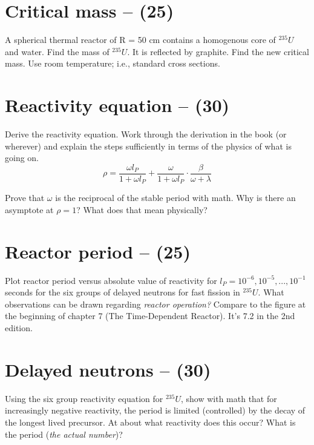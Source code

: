 \documentclass[11pt,a4paper]{article}
\begin{document}
\newpage

\section{Critical mass -- (25)}
A spherical thermal reactor of R = 50 cm contains a homogenous core of $^{235}U$ and water. Find the mass of $^{235}U$. It is reflected by graphite. Find the new critical mass. Use room temperature; i.e., standard cross sections.





\newpage

\section{Reactivity equation -- (30)}
Derive the reactivity equation. Work through the derivation in the book (or wherever) and explain the steps sufficiently in terms of the physics of what is going on.
\begin{equation} \label{eq-reactivity}
    \rho=\frac{\omega l_P}{1+\omega l_P}+\frac{\omega}{1+\omega l_P}\cdot\frac{\beta}{\omega+\lambda}
\end{equation}


Prove that $\omega$ is the reciprocal of the stable period with math. Why is there an asymptote at $\rho = 1$? What does that mean physically?





\newpage

\section{Reactor period -- (25)}
Plot reactor period versus absolute value of reactivity for $l_P = 10^{-6},10^{-5},...,10^{-1}$ seconds for the six groups of delayed neutrons for fast fission in $^{235}U$. What observations can be drawn regarding \textit{reactor operation?} Compare to the figure at the beginning of chapter 7 (The Time-Dependent Reactor). It's 7.2 in the 2nd edition.





\newpage

\section{Delayed neutrons -- (30)}
Using the six group reactivity equation for $^{235}U$, show with math that for increasingly negative reactivity, the period is limited (controlled) by the decay of the longest lived precursor. At about what reactivity does this occur? What is the period (\textit{the actual number})?
\end{document}
